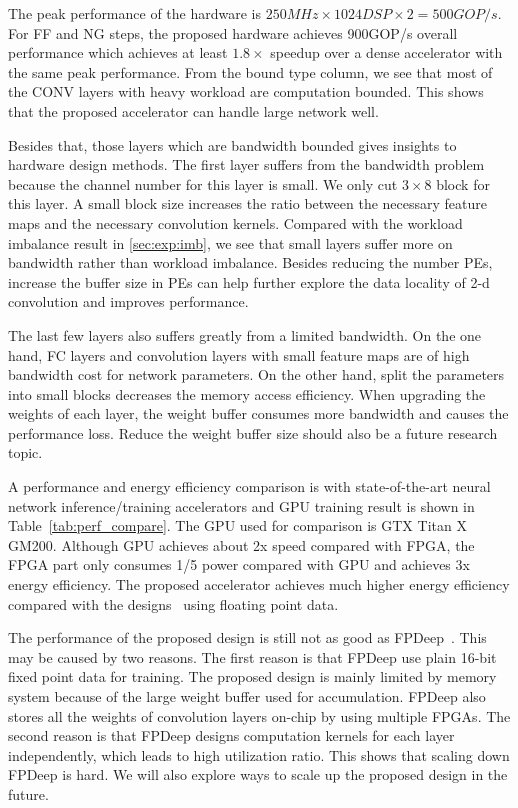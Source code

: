 



The peak performance of the hardware is $250MHz \times 1024DSP \times 2 = 500GOP/s$. For FF and NG steps, the proposed hardware achieves 900GOP/s overall performance which achieves at least $1.8\times$ speedup over a dense accelerator with the same peak performance. From the bound type column, we see that most of the CONV layers with heavy workload are computation bounded. This shows that the proposed accelerator can handle large network well.

Besides that, those layers which are bandwidth bounded gives insights to hardware design methods. The first layer suffers from the bandwidth problem because the channel number for this layer is small. We only cut $3\times 8$ block for this layer. A small block size increases the ratio between the necessary feature maps and the necessary convolution kernels. Compared with the workload imbalance result in \ref{sec:exp:imb}, we see that small layers suffer more on bandwidth rather than workload imbalance. Besides reducing the number PEs, increase the buffer size in PEs can help further explore the data locality of 2-d convolution and improves performance. 

The last few layers also suffers greatly from a limited bandwidth. On the one hand, FC layers and convolution layers with small feature maps are of high bandwidth cost for network parameters. On the other hand, split the parameters into small blocks decreases the memory access efficiency. When upgrading the weights of each layer, the weight buffer consumes more bandwidth and causes the performance loss. Reduce the weight buffer size should also be a future research topic. 

A performance and energy efficiency comparison is with state-of-the-art neural network inference/training accelerators and GPU training result is shown in Table~\ref{tab:perf_compare}. The GPU used for comparison is GTX Titan X GM200. Although GPU achieves about 2x speed compared with FPGA, the FPGA part only consumes 1/5 power compared with GPU and achieves 3x energy efficiency. The proposed accelerator achieves much higher energy efficiency compared with the designs~\cite{liu2017fpga, zhao2016f} using floating point data.

The performance of the proposed design is still not as good as FPDeep~\cite{geng2018fpdeep}. This may be caused by two reasons. The first reason is that FPDeep use plain 16-bit fixed point data for training. The proposed design is mainly limited by memory system because of the large weight buffer used for accumulation. FPDeep also stores all the weights of convolution layers on-chip by using multiple FPGAs. The second reason is that FPDeep designs computation kernels for each layer independently, which leads to high utilization ratio. This shows that scaling down FPDeep is hard. We will also explore ways to scale up the proposed design in the future.










